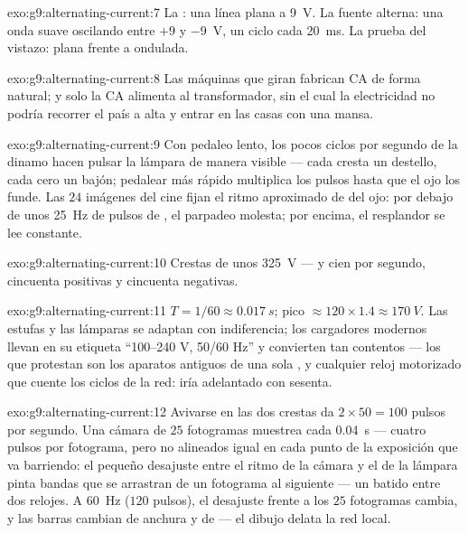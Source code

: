 \begin{solution}{exo:g9:alternating-current:7}
La : una línea plana a \qty{9}{V}. La fuente alterna: una
onda suave oscilando entre $+9$ y \qty{-9}{V}, un ciclo cada
\qty{20}{ms}. La prueba del vistazo: plana frente a ondulada.
\end{solution}

\begin{solution}{exo:g9:alternating-current:8}
Las máquinas que giran fabrican CA de forma natural; y solo la CA
alimenta al transformador, sin el cual la electricidad no podría
recorrer el país a alta  y entrar en las casas con una
mansa.
\end{solution}

\begin{solution}{exo:g9:alternating-current:9}
Con pedaleo lento, los pocos ciclos por segundo de la dinamo hacen
pulsar la lámpara de manera visible --- cada cresta un destello, cada
cero un bajón; pedalear más rápido multiplica los pulsos hasta que el
ojo los funde. Las $24$ imágenes del cine fijan el ritmo aproximado de
 del ojo: por debajo de unos \qty{25}{Hz} de pulsos de , el
parpadeo molesta; por encima, el resplandor se lee constante.
\end{solution}

\begin{solution}{exo:g9:alternating-current:10}
Crestas de unos \qty{325}{V} --- y cien por segundo, cincuenta
positivas y cincuenta negativas.
\end{solution}

\begin{solution}{exo:g9:alternating-current:11}
$T = 1/60 \approx \qty{0.017}{s}$; pico $\approx 120 \times 1.4 \approx
\qty{170}{V}$. Las estufas y las lámparas se adaptan con indiferencia;
los cargadores modernos llevan en su etiqueta ``100--240 V, 50/60 Hz''
y convierten tan contentos --- los que protestan son los aparatos
antiguos de una sola , y cualquier reloj motorizado que
cuente los ciclos de la red: iría adelantado con sesenta.
\end{solution}

\begin{solution}{exo:g9:alternating-current:12}
Avivarse en las dos crestas da $2 \times 50 = 100$ pulsos por segundo.
Una cámara de $25$ fotogramas muestrea cada \qty{0.04}{s} --- cuatro
pulsos por fotograma, pero no alineados igual en cada punto de la
exposición que va barriendo: el pequeño desajuste entre el ritmo de la
cámara y el de la lámpara pinta bandas que se arrastran de un fotograma
al siguiente --- un batido entre dos relojes. A \qty{60}{Hz} ($120$
pulsos), el desajuste frente a los $25$ fotogramas cambia, y las barras
cambian de anchura y de  --- el dibujo delata la red
local.
\end{solution}

